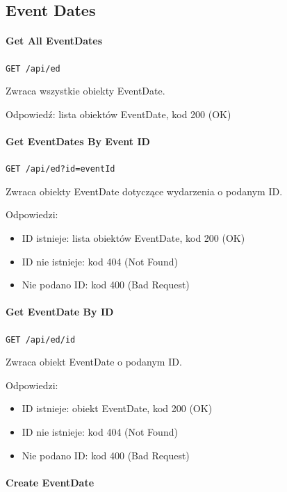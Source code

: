 \documentclass[a4paper,twoside,12pt]{book}
\begin{document}
\subsection{Event Dates}\label{event-dates}

\paragraph{Get All EventDates}\label{get-all-eventdates}

\texttt{GET /api/ed}

Zwraca wszystkie obiekty EventDate.

Odpowiedź: lista obiektów EventDate, kod 200 (OK)

\paragraph{Get EventDates By Event ID}\label{get-eventdates-by-event-id}

\texttt{GET /api/ed?id={eventId}}

Zwraca obiekty EventDate dotyczące wydarzenia o podanym ID.

Odpowiedzi: 
\begin{itemize}
	\item ID istnieje: lista obiektów EventDate, kod 200 (OK) 
	\item ID nie istnieje: kod 404 (Not Found) 
	\item Nie podano ID: kod 400 (Bad Request)
\end{itemize}

\paragraph{Get EventDate By ID}\label{get-eventdate-by-id}

\texttt{GET /api/ed/{id}}

Zwraca obiekt EventDate o podanym ID.

Odpowiedzi: 
\begin{itemize}
	\item ID istnieje: obiekt EventDate, kod 200 (OK) 
	\item ID nie istnieje: kod 404 (Not Found) 
	\item Nie podano ID: kod 400 (Bad Request)
\end{itemize}

\paragraph{Create EventDate}\label{create-eventdate}
\end{document}
